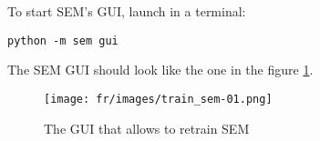 \documentclass[manual-fr.tex]{subfiles}
\begin{document}
To start SEM's GUI, launch in a terminal:

\begin{lstlisting}[style=pieceofcode,frame=single]
python -m sem gui
\end{lstlisting}

The SEM GUI should look like the one in the figure \ref{fig:train_sem-01}.

\begin{figure}[ht!]
    \begin{center}
    \texttt{[image: fr/images/train\_sem-01.png]}
    \end{center}
    \caption{The GUI that allows to retrain SEM}
    \label{fig:train_sem-01}
\end{figure}
\end{document}
